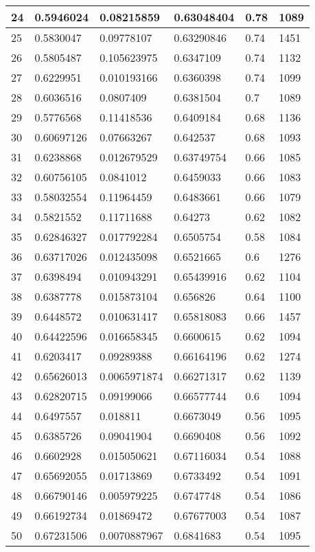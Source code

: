 \begin{longtable}{|l|l|l|l|l|l|}
24 & 0.5946024 & 0.08215859 & 0.63048404 & 0.78 & 1089 \\ \hline 
25 & 0.5830047 & 0.09778107 & 0.63290846 & 0.74 & 1451 \\ \hline 
26 & 0.5805487 & 0.105623975 & 0.6347109 & 0.74 & 1132 \\ \hline 
27 & 0.6229951 & 0.010193166 & 0.6360398 & 0.74 & 1099 \\ \hline 
28 & 0.6036516 & 0.0807409 & 0.6381504 & 0.7 & 1089 \\ \hline 
29 & 0.5776568 & 0.11418536 & 0.6409184 & 0.68 & 1136 \\ \hline 
30 & 0.60697126 & 0.07663267 & 0.642537 & 0.68 & 1093 \\ \hline 
31 & 0.6238868 & 0.012679529 & 0.63749754 & 0.66 & 1085 \\ \hline 
32 & 0.60756105 & 0.0841012 & 0.6459033 & 0.66 & 1083 \\ \hline 
33 & 0.58032554 & 0.11964459 & 0.6483661 & 0.66 & 1079 \\ \hline 
34 & 0.5821552 & 0.11711688 & 0.64273 & 0.62 & 1082 \\ \hline 
35 & 0.62846327 & 0.017792284 & 0.6505754 & 0.58 & 1084 \\ \hline 
36 & 0.63717026 & 0.012435098 & 0.6521665 & 0.6 & 1276 \\ \hline 
37 & 0.6398494 & 0.010943291 & 0.65439916 & 0.62 & 1104 \\ \hline 
38 & 0.6387778 & 0.015873104 & 0.656826 & 0.64 & 1100 \\ \hline 
39 & 0.6448572 & 0.010631417 & 0.65818083 & 0.66 & 1457 \\ \hline 
40 & 0.64422596 & 0.016658345 & 0.6600615 & 0.62 & 1094 \\ \hline 
41 & 0.6203417 & 0.09289388 & 0.66164196 & 0.62 & 1274 \\ \hline 
42 & 0.65626013 & 0.0065971874 & 0.66271317 & 0.62 & 1139 \\ \hline 
43 & 0.62820715 & 0.09199066 & 0.66577744 & 0.6 & 1094 \\ \hline 
44 & 0.6497557 & 0.018811 & 0.6673049 & 0.56 & 1095 \\ \hline 
45 & 0.6385726 & 0.09041904 & 0.6690408 & 0.56 & 1092 \\ \hline 
46 & 0.6602928 & 0.015050621 & 0.67116034 & 0.54 & 1088 \\ \hline 
47 & 0.65692055 & 0.01713869 & 0.6733492 & 0.54 & 1091 \\ \hline 
48 & 0.66790146 & 0.005979225 & 0.6747748 & 0.54 & 1086 \\ \hline 
49 & 0.66192734 & 0.01869472 & 0.67677003 & 0.54 & 1087 \\ \hline 
50 & 0.67231506 & 0.0070887967 & 0.6841683 & 0.54 & 1095 \\ \hline 
\end{longtable}